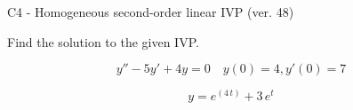 \begin{exercise}
  \begin{exerciseTitle}C4 - Homogeneous second-order linear IVP (ver. 48)\end{exerciseTitle}
  \begin{exerciseStatement}
    
Find the solution to the given IVP.

    
\[y''-5y'+4y = 0 \hspace{1em} y(0) = 4 , y'(0) = 7\]

  \end{exerciseStatement}
  \begin{exerciseAnswer}
    
\[y= e^{\left(4 \, t\right)} + 3 \, e^{t}\]

  \end{exerciseAnswer}
\end{exercise}